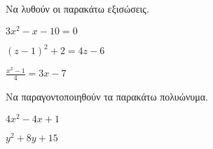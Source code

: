 \documentclass[internet]{diag-xelatex}
\begin{document}
\begin{thema}
\begin{erwthma}
\item Να λυθούν οι παρακάτω εξισώσεις.
\begin{multicols}{3}
\begin{rlist}
\item $ 3x^2-x-10=0 $
\item $ (z-1)^2+2=4z-6 $
\item $ \frac{x^2-1}{4}=3x-7 $
\end{rlist}
\end{multicols}
\item Να παραγοντοποιηθούν τα παρακάτω πολυώνυμα.
\begin{multicols}{2}
\begin{rlist}
\item $ 4x^2-4x+1 $
\item $ y^2+8y+15 $
\end{rlist}
\end{multicols}
\end{erwthma}
\end{thema}
\kaliepityxia
\end{document}
